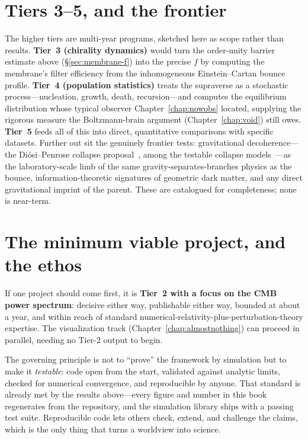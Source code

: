 \section{Tiers 3--5, and the frontier}
\label{sec:tier3-frontier}

The higher tiers are multi-year programs, sketched here as scope rather than
results. \textbf{Tier~3 (chirality dynamics)} would turn the order-unity barrier
estimate above (\S\ref{sec:membrane-f}) into the precise $f$ by computing the
membrane's filter efficiency from the inhomogeneous Einstein--Cartan bounce profile.
\textbf{Tier~4 (population statistics)} treats the supraverse as a stochastic
process---nucleation, growth, death, recursion---and computes the equilibrium
distribution whose typical observer Chapter~\ref{chap:nowobs} located, supplying
the rigorous measure the Boltzmann-brain argument (Chapter~\ref{chap:void}) still
owes. \textbf{Tier~5} feeds all of this into direct, quantitative comparisons with
specific datasets. Further out sit the genuinely frontier tests: gravitational
decoherence---the Di\'osi--Penrose collapse
proposal~\citep{diosi1989,penrose1996}, among the testable collapse
models~\citep{bassi2013}---as the laboratory-scale limb of the same
gravity-separates-branches
physics as the bounce, information-theoretic signatures of geometric dark matter,
and any direct gravitational imprint of the parent. These are catalogued for
completeness; none is near-term.

\section{The minimum viable project, and the ethos}

If one project should come first, it is \textbf{Tier~2 with a focus on the CMB
power spectrum}: decisive either way, publishable either way, bounded at about a
year, and within reach of standard numerical-relativity-plus-perturbation-theory
expertise. The visualization track (Chapter~\ref{chap:almostnothing}) can proceed
in parallel, needing no Tier-2 output to begin.

The governing principle is not to ``prove'' the framework by simulation but to
make it \emph{testable}: code open from the start, validated against analytic
limits, checked for numerical convergence, and reproducible by anyone. That
standard is already met by the results above---every figure and number in this
book regenerates from the repository, and the simulation library ships with a
passing test suite. Reproducible code lets others check, extend, and challenge the
claims, which is the only thing that turns a worldview into science.
